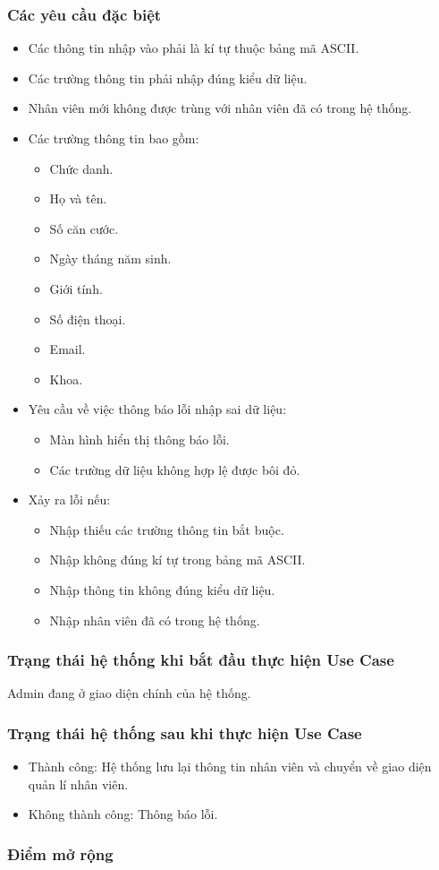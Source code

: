 \subsubsection{Các yêu cầu đặc biệt}
\begin{itemize}
  \item Các thông tin nhập vào phải là kí tự thuộc bảng mã ASCII.
  \item Các trường thông tin phải nhập đúng kiểu dữ liệu.
  \item Nhân viên mới không được trùng với nhân viên đã có trong hệ thống.
  \item Các trường thông tin bao gồm:
  \begin{itemize}
    \item Chức danh.
    \item Họ và tên.
    \item Số căn cước.
    \item Ngày tháng năm sinh.
    \item Giới tính.
    \item Số điện thoại.
    \item Email.
    \item Khoa.
  \end{itemize}
  \item Yêu cầu về việc thông báo lỗi nhập sai dữ liệu:
  \begin{itemize}
    \item Màn hình hiển thị thông báo lỗi.
    \item Các trường dữ liệu không hợp lệ được bôi đỏ.
  \end{itemize}
  \item Xảy ra lỗi nếu:
  \begin{itemize}
    \item Nhập thiếu các trường thông tin bắt buộc.
    \item Nhập không đúng kí tự trong bảng mã ASCII.
    \item Nhập thông tin không đúng kiểu dữ liệu.
    \item Nhập nhân viên đã có trong hệ thống.
  \end{itemize}
\end{itemize}

\subsubsection{Trạng thái hệ thống khi bắt đầu thực hiện Use Case}
Admin đang ở giao diện chính của hệ thống.

\subsubsection{Trạng thái hệ thống sau khi thực hiện Use Case}
\begin{itemize}
  \item Thành công: Hệ thống lưu lại thông tin nhân viên và chuyển về giao diện quản lí nhân viên.
  \item Không thành công: Thông báo lỗi.
\end{itemize}

\subsubsection{Điểm mở rộng}
